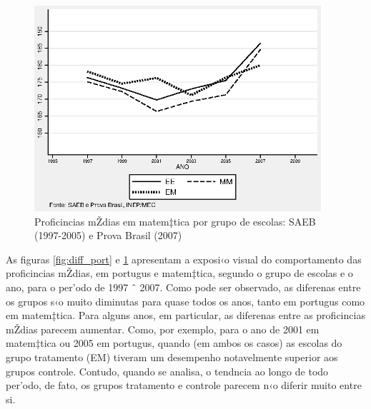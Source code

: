 \documentclass[a4paper, 12pt]{article}
\begin{document}




\begin{figure}[h]
\centering
\begin{footnotesize}
\caption{Proficincias mŽdias em matem‡tica por grupo \newline de escolas: SAEB (1997-2005) e Prova Brasil (2007)} 
\label{fig:diff_mat}                             
 \includegraphics[height=3in]{diff_mat}
\end{footnotesize}
\end{figure}
 



As figuras \ref{fig:diff_port} e \ref{fig:diff_mat} apresentam a exposi‹o visual do comportamento das proficincias mŽdias, em portugus e matem‡tica, segundo o grupo de escolas e o ano,  para o per’odo de 1997 ˆ 2007. Como pode ser observado, as diferenas entre os grupos s‹o muito diminutas para quase todos os anos, tanto em portugus como em matem‡tica. Para alguns anos, em particular, as diferenas entre as proficincias mŽdias parecem aumentar. Como, por exemplo, para o ano de 2001 em matem‡tica ou 2005 em portugus, quando (em ambos os casos) as escolas do grupo tratamento (EM) tiveram um desempenho notavelmente superior aos grupos controle. Contudo, quando se analisa, o tendncia ao longo de todo per’odo, de fato, os grupos tratamento e controle parecem n‹o diferir muito entre si. 
\end{document}
